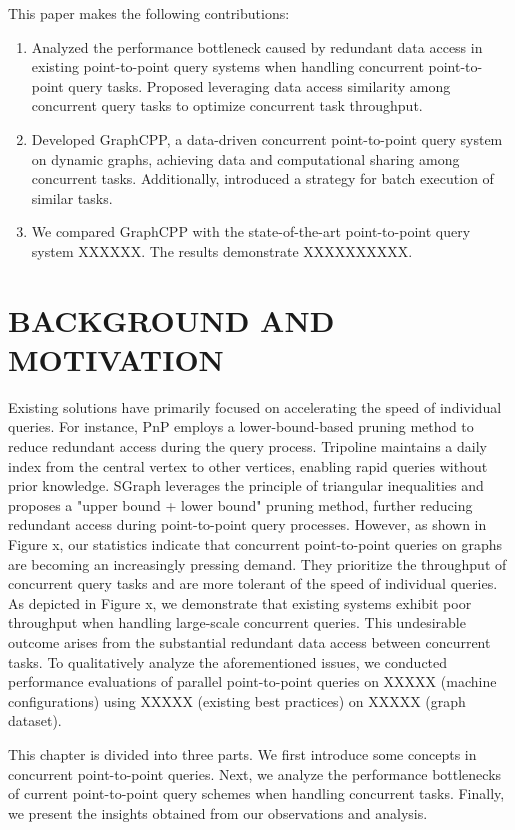 \documentclass[lettersize,journal]{IEEEtran} %
\begin{document}
This paper makes the following contributions:
\begin{enumerate}
  \item{Analyzed the performance bottleneck caused by redundant data access in existing point-to-point query systems when handling concurrent point-to-point query tasks. Proposed leveraging data access similarity among concurrent query tasks to optimize concurrent task throughput.}
  \item{Developed GraphCPP, a data-driven concurrent point-to-point query system on dynamic graphs, achieving data and computational sharing among concurrent tasks. Additionally, introduced a strategy for batch execution of similar tasks.}
  \item{We compared GraphCPP with the state-of-the-art point-to-point query system XXXXXX. The results demonstrate XXXXXXXXXX.}
\end{enumerate}

\section{BACKGROUND AND MOTIVATION}
Existing solutions have primarily focused on accelerating the speed of individual queries. For instance, PnP employs a lower-bound-based pruning method to reduce redundant access during the query process. Tripoline maintains a daily index from the central vertex to other vertices, enabling rapid queries without prior knowledge. SGraph leverages the principle of triangular inequalities and proposes a "upper bound + lower bound" pruning method, further reducing redundant access during point-to-point query processes. However, as shown in Figure x, our statistics indicate that concurrent point-to-point queries on graphs are becoming an increasingly pressing demand. They prioritize the throughput of concurrent query tasks and are more tolerant of the speed of individual queries. As depicted in Figure x, we demonstrate that existing systems exhibit poor throughput when handling large-scale concurrent queries. This undesirable outcome arises from the substantial redundant data access between concurrent tasks. To qualitatively analyze the aforementioned issues, we conducted performance evaluations of parallel point-to-point queries on XXXXX (machine configurations) using XXXXX (existing best practices) on XXXXX (graph dataset).

This chapter is divided into three parts. We first introduce some concepts in concurrent point-to-point queries. Next, we analyze the performance bottlenecks of current point-to-point query schemes when handling concurrent tasks. Finally, we present the insights obtained from our observations and analysis.
\end{document}
